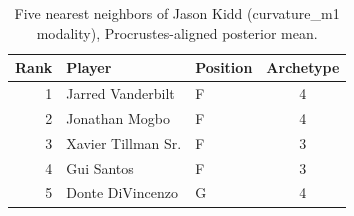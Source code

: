 \begin{table}[htbp]
  \centering\small
  \begin{tabular}{rllc}
    \toprule
    Rank & Player & Position & Archetype \\
    \midrule
    1 & Jarred Vanderbilt & F & 4 \\
    2 & Jonathan Mogbo & F & 4 \\
    3 & Xavier Tillman Sr. & F & 3 \\
    4 & Gui Santos & F & 3 \\
    5 & Donte DiVincenzo & G & 4 \\
    \bottomrule
  \end{tabular}
  \caption{Five nearest neighbors of Jason Kidd (curvature_m1 modality), Procrustes-aligned posterior mean.}
  \label{tab:Jason_Kidd_neighbors_curvature_m1}
\end{table}

